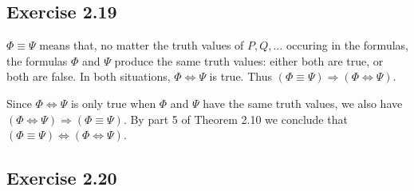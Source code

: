 \documentclass[leqno]{article}
\renewcommand{\iff}{\Leftrightarrow}
\renewcommand{\implies}{\Rightarrow}
\begin{document}
\subsection*{Exercise 2.19}
$\Phi \equiv \Psi$ means that, no matter the truth values of $P, Q, \dots$ occuring in the formulas, the formulas $\Phi$ and $\Psi$ produce the same truth values: either both are true, or both are false. In both situations, $\Phi \iff \Psi$ is true.
Thus $(\Phi \equiv \Psi) \implies (\Phi \iff \Psi)$.

Since $\Phi \iff \Psi$ is only true when $\Phi$ and $\Psi$ have the same truth values, we also have $(\Phi \iff \Psi) \implies (\Phi \equiv \Psi)$. By part 5 of Theorem 2.10 we conclude that $(\Phi \equiv \Psi) \iff (\Phi \iff \Psi)$.

\subsection*{Exercise 2.20}
\end{document}
